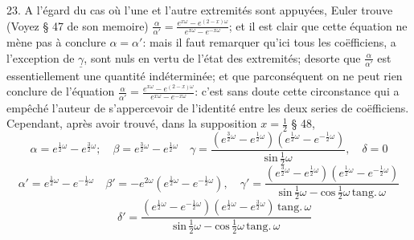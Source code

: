 \documentclass[11pt,a4paper]{article}
\begin{document}
23. A l'égard du cas où l'une et l'autre extremités sont appuyées, Euler
trouve (Voyez § 47 \struck{\ill{}} de son memoire) $\frac{\alpha}{\alpha'} = \frac{e^{x\omega} - e^{(2-x)\omega}}{e^{x\omega} - e^{-x\omega}}$; et il est clair que cette équation
ne mène pas à conclure $\alpha = \alpha'$: mais il faut remarquer qu'ici tous les coëfficiens,
a l'exception de $\underline{\gamma}$, sont nuls en vertu de l'état des extremités; desorte que
$\frac{\alpha}{\alpha'}$ est essentiellement une quantité indéterminée; et que parconséquent on ne
peut rien conclure de l'équation $\frac{\alpha}{\alpha'} = \frac{e^{x\omega} - e^{(2-x)\omega}}{e^{x\omega} - e^{-x\omega}}$: c'est sans doute cette circonstance
qui a empêché l'auteur de s'appercevoir de l'identité entre les deux series
de coëfficiens. Cependant, après avoir trouvé, dans la supposition $x = \frac{1}{2}$ § 48,
\[ \alpha = e^{\frac{1}{2}\omega} - e^{\frac{3}{2}\omega};\quad \beta = e^{\frac{3}{2}\omega} - e^{\frac{1}{2}\omega}\quad \gamma = \frac{(e^{\frac{3}{2}\omega} - e^{\frac{1}{2}\omega})(e^{\frac{1}{2}\omega} - e^{-\frac{1}{2}\omega})}{\text{sin}\,\frac{1}{2}\omega},\quad \delta = 0 \]
\[ \alpha' = e^{\frac{1}{2}\omega} - e^{-\frac{1}{2}\omega}\quad \beta' = -e^{2\omega}(e^{\frac{1}{2}\omega} - e^{-\frac{1}{2}\omega}),\quad \gamma' = \frac{(e^{\frac{3}{2}\omega} - e^{\frac{1}{2}\omega})(e^{\frac{1}{2}\omega} - e^{-\frac{1}{2}\omega})}{\text{sin}\,\frac{1}{2}\omega - \text{cos}\,\frac{1}{2}\omega\,\text{tang}.\,\omega} \]
\[ \quad \delta' = \frac{(e^{\frac{1}{2}\omega} - e^{-\frac{1}{2}\omega})(e^{\frac{1}{2}\omega} - e^{\frac{3}{2}\omega})\,\text{tang}.\,\omega}{\text{sin}\,\frac{1}{2}\omega - \text{cos}\,\frac{1}{2}\omega\,\text{tang}.\,\omega} \]
\end{document}

